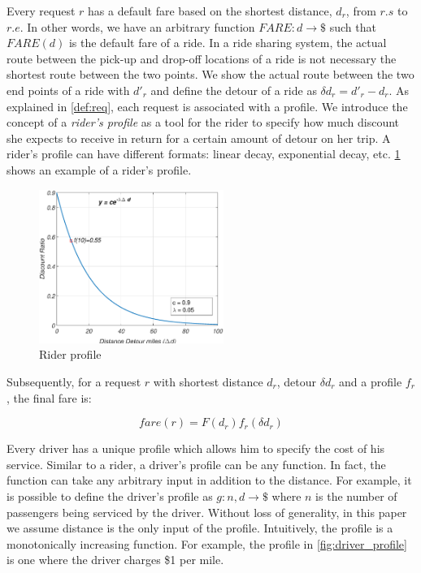 Every request $r$ has a default fare based on the shortest distance, $d_r$, from $r.s$ to $r.e$. In other words, we have an arbitrary function $FARE: d \rightarrow \$ $ such that $FARE(d)$ is the default fare of a ride. In a ride sharing system, the actual route between the pick-up and drop-off locations of a ride is not necessary the shortest route between the two points. We show the actual route between the two end points of a ride with $d'_r$ and define the detour of a ride as $\delta d_r = d'_r - d_r$. As explained in \cref{def:req}, each request is associated with a profile. We introduce the concept of a \textit{rider's profile} as a tool for the rider to specify how much discount she expects to receive in return for a certain amount of detour on her trip. A rider's profile can have different formats: linear decay, exponential decay, etc. \cref{fig:rider_profile} shows an example of a rider's profile.

\begin{figure}[!ht]
	\centering
	\includegraphics[width = 60mm]{fig/rider.eps}
	\vspace{-0mm}\caption{Rider profile} \vspace{-2mm} \label{fig:rider_profile}
\end{figure}\vspace{-0mm}

Subsequently, for a request $r$ with shortest distance $d_r$, detour $\delta d_r$ and a profile $f_r$, the final fare is:

\begin{equation}
\label{eq:fare}
fare(r) = F(d_r) f_r(\delta d_r)
\end{equation}

Every driver has a unique profile which allows him to specify the cost of his service. Similar to a rider, a driver's profile can be any function. In fact, the function can take any arbitrary input in addition to the distance. For example, it is possible to define the driver's profile as $g: n, d \rightarrow \$$ where $n$ is the number of passengers being serviced by the driver. Without loss of generality, in this paper we assume distance is the only input of the profile. Intuitively, the profile is a monotonically increasing function. For example, the profile in \cref{fig:driver_profile} is one where the driver charges \$1 per mile.

